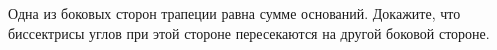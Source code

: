 \begin{ex}
	\begin{condition}
		Одна из боковых сторон трапеции равна сумме оснований. Докажите, что биссектрисы углов при этой стороне	пересекаются на другой боковой стороне.
	\end{condition}
\end{ex}